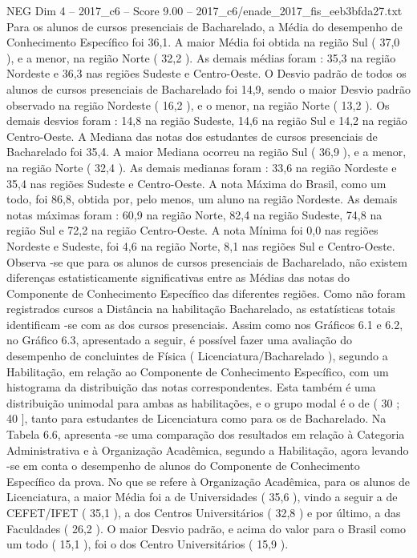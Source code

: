 \begin{textsample}{NEG Dim 4 – 2017\_c6 – Score 9.00 – 2017\_c6/enade\_2017\_fis\_eeb3bfda27.txt}
Para os alunos de cursos presenciais de Bacharelado, a Média do desempenho de Conhecimento Específico foi 36,1.
A maior Média foi obtida na região Sul ( 37,0 ), e a menor, na região Norte ( 32,2 ).
As demais médias foram : 35,3 na região Nordeste e 36,3 nas regiões Sudeste e Centro-Oeste.
O Desvio padrão de todos os alunos de cursos presenciais de Bacharelado foi 14,9, sendo o maior Desvio padrão observado na região Nordeste ( 16,2 ), e o menor, na região Norte ( 13,2 ).
Os demais desvios foram : 14,8 na região Sudeste, 14,6 na região Sul e 14,2 na região Centro-Oeste.
A Mediana das notas dos estudantes de cursos presenciais de Bacharelado foi 35,4.
A maior Mediana ocorreu na região Sul ( 36,9 ), e a menor, na região Norte ( 32,4 ).
As demais medianas foram : 33,6 na região Nordeste e 35,4 nas regiões Sudeste e Centro-Oeste.
A nota Máxima do Brasil, como um todo, foi 86,8, obtida por, pelo menos, um aluno na região Nordeste.
As demais notas máximas foram : 60,9 na região Norte, 82,4 na região Sudeste, 74,8 na região Sul e 72,2 na região Centro-Oeste.
A nota Mínima foi 0,0 nas regiões Nordeste e Sudeste, foi 4,6 na região Norte, 8,1 nas regiões Sul e Centro-Oeste.
Observa -se que para os alunos de cursos presenciais de Bacharelado, não existem diferenças estatisticamente significativas entre as Médias das notas do Componente de Conhecimento Específico das diferentes regiões.
Como não foram registrados cursos a Distância na habilitação Bacharelado, as estatísticas totais identificam -se com as dos cursos presenciais.
Assim como nos Gráficos 6.1 e 6.2, no Gráfico 6.3, apresentado a seguir, é possível fazer uma avaliação do desempenho de concluintes de Física ( Licenciatura/Bacharelado ), segundo a Habilitação, em relação ao Componente de Conhecimento Específico, com um histograma da distribuição das notas correspondentes.
Esta também é uma distribuição unimodal para ambas as habilitações, e o grupo modal é o de ( 30 ; 40 ], tanto para estudantes de Licenciatura como para os de Bacharelado.
Na Tabela 6.6, apresenta -se uma comparação dos resultados em relação à Categoria Administrativa e à Organização Acadêmica, segundo a Habilitação, agora levando -se em conta o desempenho de alunos do Componente de Conhecimento Específico da prova.
No que se refere à Organização Acadêmica, para os alunos de Licenciatura, a maior Média foi a de Universidades ( 35,6 ), vindo a seguir a de CEFET/IFET ( 35,1 ), a dos Centros Universitários ( 32,8 ) e por último, a das Faculdades ( 26,2 ).
O maior Desvio padrão, e acima do valor para o Brasil como um todo ( 15,1 ), foi o dos Centro Universitários ( 15,9 ).

\end{textsample}
